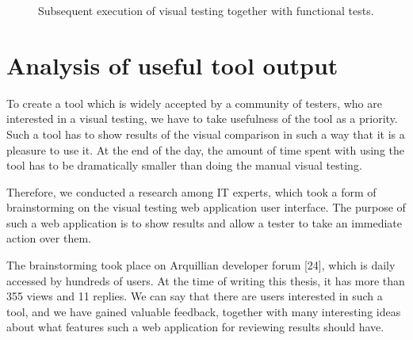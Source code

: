 \documentclass[11pt,oneside,final]{fithesis2}
\begin{document}
  \begin{figure}[!htb]
    \begin{center}
    \leavevmode
    \centerline{}
    \end{center}
    \caption{Subsequent execution of visual testing together with functional tests.}
    \label{fig:NextTestsRunsBMPN}
  \end{figure}
  
  \newpage
  \section{Analysis of useful tool output}
  \label{sec:analysisUsefulOutput}
  To create a tool which is widely accepted by a community of testers, who are interested in a visual testing, we have to take usefulness of the tool as a priority. Such a tool has to show results
  of the visual comparison in such a way that it is a pleasure to use it. At the end of the day, the amount of time spent with using the tool has to be dramatically smaller than doing the manual
  visual testing.
   
  Therefore, we conducted a research among IT experts, which took a form of brainstorming on the visual testing web application user interface. The purpose of such a web application is to show
  results and allow a tester to take an immediate action over them.
  
  The brainstorming took place on Arquillian developer forum [24], which is daily accessed by hundreds of users. At the time of writing this thesis, it has more than 355 views 
  and 11 replies. We can say that there are users interested in such a tool, and we have gained valuable feedback, together with many interesting ideas about what features such a web application
  for reviewing results should have.
  
\end{document}
